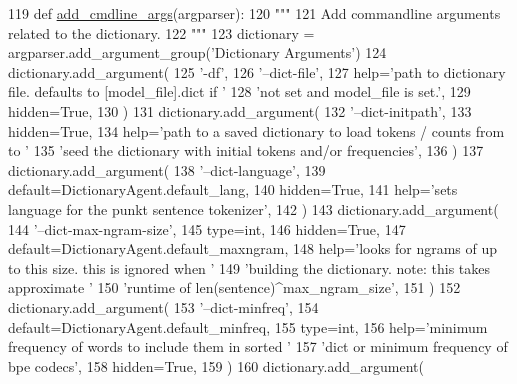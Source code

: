 \begin{DoxyCode}
119     \textcolor{keyword}{def }\hyperlink{namespaceparlai_1_1agents_1_1drqa_1_1config_a62fdd5554f1da6be0cba185271058320}{add\_cmdline\_args}(argparser):
120         \textcolor{stringliteral}{"""}
121 \textcolor{stringliteral}{        Add commandline arguments related to the dictionary.}
122 \textcolor{stringliteral}{        """}
123         dictionary = argparser.add\_argument\_group(\textcolor{stringliteral}{'Dictionary Arguments'})
124         dictionary.add\_argument(
125             \textcolor{stringliteral}{'-df'},
126             \textcolor{stringliteral}{'--dict-file'},
127             help=\textcolor{stringliteral}{'path to dictionary file. defaults to [model\_file].dict if '}
128             \textcolor{stringliteral}{'not set and model\_file is set.'},
129             hidden=\textcolor{keyword}{True},
130         )
131         dictionary.add\_argument(
132             \textcolor{stringliteral}{'--dict-initpath'},
133             hidden=\textcolor{keyword}{True},
134             help=\textcolor{stringliteral}{'path to a saved dictionary to load tokens / counts from to '}
135             \textcolor{stringliteral}{'seed the dictionary with initial tokens and/or frequencies'},
136         )
137         dictionary.add\_argument(
138             \textcolor{stringliteral}{'--dict-language'},
139             default=DictionaryAgent.default\_lang,
140             hidden=\textcolor{keyword}{True},
141             help=\textcolor{stringliteral}{'sets language for the punkt sentence tokenizer'},
142         )
143         dictionary.add\_argument(
144             \textcolor{stringliteral}{'--dict-max-ngram-size'},
145             type=int,
146             hidden=\textcolor{keyword}{True},
147             default=DictionaryAgent.default\_maxngram,
148             help=\textcolor{stringliteral}{'looks for ngrams of up to this size. this is ignored when '}
149             \textcolor{stringliteral}{'building the dictionary. note: this takes approximate '}
150             \textcolor{stringliteral}{'runtime of len(sentence)^max\_ngram\_size'},
151         )
152         dictionary.add\_argument(
153             \textcolor{stringliteral}{'--dict-minfreq'},
154             default=DictionaryAgent.default\_minfreq,
155             type=int,
156             help=\textcolor{stringliteral}{'minimum frequency of words to include them in sorted '}
157             \textcolor{stringliteral}{'dict or minimum frequency of bpe codecs'},
158             hidden=\textcolor{keyword}{True},
159         )
160         dictionary.add\_argument(

\end{DoxyCode}
